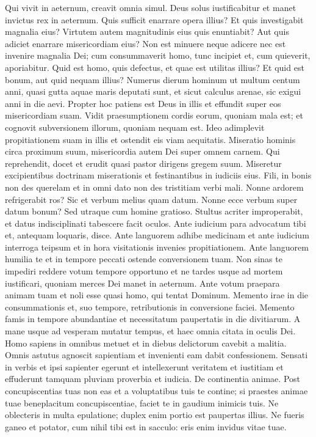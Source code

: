 \begin{biblechapter}  
\verse Qui vivit in aeternum, creavit omnia simul. Deus solus iustificabitur et manet invictus rex in aeternum. 
\verse Quis sufficit enarrare opera illius? 
\verse Et quis investigabit magnalia eius? 
\verse Virtutem autem magnitudinis eius quis enuntiabit? Aut quis adiciet enarrare misericordiam eius? 
\verse Non est minuere neque adicere nec est invenire magnalia Dei; 
\verse cum consummaverit homo, tunc incipiet et, cum quieverit, aporiabitur. 
\verse Quid est homo, quis defectus, et quae est utilitas illius? Et quid est bonum, aut quid nequam illius? 
\verse Numerus dierum hominum ut multum centum anni, quasi gutta aquae maris deputati sunt, et sicut calculus arenae, sic exigui anni in die aevi. 
\verse Propter hoc patiens est Deus in illis et effundit super eos misericordiam suam. 
\verse Vidit praesumptionem cordis eorum, quoniam mala est; et cognovit subversionem illorum, quoniam nequam est. 
\verse Ideo adimplevit propitiationem suam in illis et ostendit eis viam aequitatis. 
\verse Miseratio hominis circa proximum suum, misericordia autem Dei super omnem carnem. 
\verse Qui reprehendit, docet et erudit quasi pastor dirigens gregem suum. 
\verse Miseretur excipientibus doctrinam miserationis et festinantibus in iudiciis eius. 
\verse Fili, in bonis non des querelam et in omni dato non des tristitiam verbi mali. 
\verse Nonne ardorem refrigerabit ros? Sic et verbum melius quam datum. 
\verse Nonne ecce verbum super datum bonum? Sed utraque cum homine gratioso. 
\verse Stultus acriter improperabit, et datus indisciplinati tabescere facit oculos. 
\verse Ante iudicium para advocatum tibi et, antequam loquaris, disce. 
\verse Ante languorem adhibe medicinam et ante iudicium interroga teipsum et in hora visitationis invenies propitiationem. 
\verse Ante languorem humilia te et in tempore peccati ostende conversionem tuam. 
\verse Non sinas te impediri reddere votum tempore opportuno et ne tardes usque ad mortem iustificari, quoniam merces Dei manet in aeternum. 
\verse Ante votum praepara animam tuam et noli esse quasi homo, qui tentat Dominum. 
\verse Memento irae in die consummationis et, suo tempore, retributionis in conversione faciei. 
\verse Memento famis in tempore abundantiae et necessitatum paupertatis in die divitiarum. 
\verse A mane usque ad vesperam mutatur tempus, et haec omnia citata in oculis Dei. 
\verse Homo sapiens in omnibus metuet et in diebus delictorum cavebit a malitia. 
\verse Omnis astutus agnoscit sapientiam et invenienti eam dabit confessionem. 
\verse Sensati in verbis et ipsi sapienter egerunt et intellexerunt veritatem et iustitiam et effuderunt tamquam pluviam proverbia et iudicia. 
\verse De continentia animae. Post concupiscentias tuas non eas et a voluptatibus tuis te contine; 
\verse si praestes animae tuae beneplacitum concupiscentiae, faciet te in gaudium inimicis tuis. 
\verse Ne oblecteris in multa epulatione; duplex enim portio est paupertas illius. 
\verse Ne fueris ganeo et potator, cum nihil tibi est in sacculo: eris enim invidus vitae tuae. 
\end{biblechapter}

